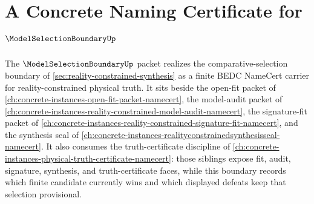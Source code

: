 \chapter{A Concrete Naming Certificate for $\ModelSelectionBoundaryUp$}
\label{ch:concrete-instances-model-selection-boundary-namecert}

The $\ModelSelectionBoundaryUp$ packet realizes the comparative-selection boundary of \autoref{sec:reality-constrained-synthesis} as a finite BEDC NameCert carrier for reality-constrained physical truth. It sits beside the open-fit packet of \autoref{ch:concrete-instances-open-fit-packet-namecert}, the model-audit packet of \autoref{ch:concrete-instances-reality-constrained-model-audit-namecert}, the signature-fit packet of \autoref{ch:concrete-instances-reality-constrained-signature-fit-namecert}, and the synthesis seal of \autoref{ch:concrete-instances-realityconstrainedsynthesisseal-namecert}. It also consumes the truth-certificate discipline of \autoref{ch:concrete-instances-physical-truth-certificate-namecert}: those siblings expose fit, audit, signature, synthesis, and truth-certificate faces, while this boundary records which finite candidate currently wins and which displayed defeats keep that selection provisional.

